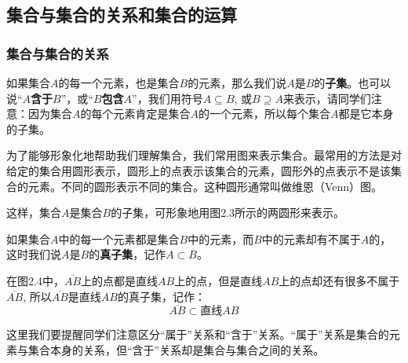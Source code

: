 \subsection{集合与集合的关系和集合的运算}

\subsubsection{集合与集合的关系}
如果集合$A$的每一个元素，也是集合$B$的元素，那么我们说$A$是$B$的\textbf{子集}。也可以说“$A$\textbf{含于}$B$”，或“$B$\textbf{包含}$A$”，我们用符号$A\subseteq B$, 或$B\supseteq A$来表示，请同学们注意：因为集合$A$的每个元素肯定是集合$A$的一个元素，所以每个集合$A$都是它本身的子集。

为了能够形象化地帮助我们理解集合，我们常用图来表示集合。最常用的方法是对给定的集合用圆形表示，圆形上的点表示该集合的元素，圆形外的点表示不是该集合的元素。不同的圆形表示不同的集合。这种圆形通常叫做维恩（Venn）图。

这样，集合$A$是集合$B$的子集，可形象地用图2.3所示的两圆形来表示。

如果集合$A$中的每一个元素都是集合$B$中的元素，而$B$中的元素却有不属于$A$的，这时我们说$A$是$B$的\textbf{真子集}，记作$A\subset B$。
\begin{figure}[htp]\centering
    \begin{minipage}[t]{0.48\textwidth}
    \centering
{}
    \caption{}
    \end{minipage}
    \begin{minipage}[t]{0.48\textwidth}
    \centering
    \caption{}
    \end{minipage}
    \end{figure}

在图2.4中，$\overline{AB}$上的点都是直线$AB$上的点，但是直线$AB$上的点却还有很多不属于$\overline{AB}$, 所以$\overline{AB}$是直线$AB$的真子集，记作：
\[\overline{AB}\subset \text{直线}AB\]

这里我们要提醒同学们注意区分“属于”关系和“含于”关系。“属于”关系是集合的元素与集合本身的关系，但“含于”关系却是集合与集合之间的关系。

